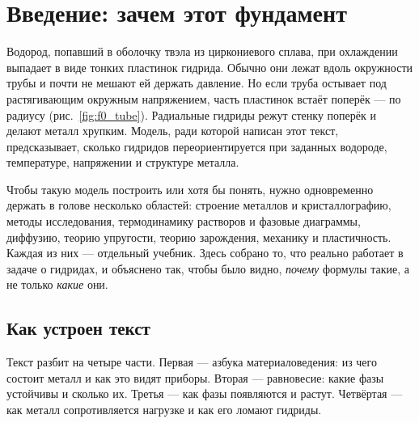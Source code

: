 \chapter*{Введение: зачем этот фундамент}

Водород, попавший в оболочку твэла из циркониевого сплава, при охлаждении выпадает в виде тонких пластинок
гидрида. Обычно они лежат вдоль окружности трубы и почти не мешают ей держать давление. Но если труба остывает под
растягивающим окружным напряжением, часть пластинок встаёт поперёк --- по радиусу (рис.~\ref{fig:f0_tube}).
Радиальные гидриды режут стенку поперёк и делают металл хрупким. Модель, ради которой написан этот текст,
предсказывает, сколько гидридов переориентируется при заданных водороде, температуре, напряжении и структуре
металла.


Чтобы такую модель построить или хотя бы понять, нужно одновременно держать в голове несколько областей:
строение металлов и кристаллографию, методы исследования, термодинамику растворов и фазовые диаграммы, диффузию,
теорию упругости, теорию зарождения, механику и пластичность. Каждая из них --- отдельный учебник. Здесь собрано
то, что реально работает в задаче о гидридах, и объяснено так, чтобы было видно, \emph{почему} формулы такие, а
не только \emph{какие} они.

\section*{Как устроен текст}

Текст разбит на четыре части. Первая --- азбука материаловедения: из чего состоит металл и как это видят приборы.
Вторая --- равновесие: какие фазы устойчивы и сколько их. Третья --- как фазы появляются и растут. Четвёртая ---
как металл сопротивляется нагрузке и как его ломают гидриды.

